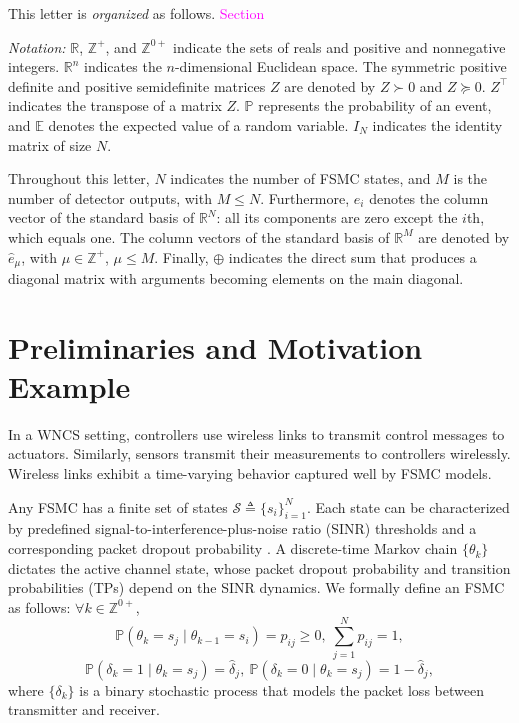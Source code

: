 \documentclass[journal,twoside,web]{ieeecolor}
\begin{document}
This letter is \emph{organized} as follows. 
\textcolor{magenta}{Section}

\textit{Notation:} $\mathbb{R}$, $\mathbb{Z}^{+}$, and $\mathbb{Z}^{0+}$ indicate the sets of reals and positive and nonnegative integers. $\mathbb{R}^{n}$ indicates the $n$-dimensional Euclidean space. The symmetric positive definite and positive semidefinite matrices $Z$ are denoted by $Z\succ 0$ and $Z\succeq 0$. $Z^{\top}$ indicates the transpose of a matrix $Z$. $\mathbb{P}$ represents the probability of an event, and $\mathbb{E}$ denotes the expected value of a random variable. $I_N$ indicates the identity matrix of size $N$. 

Throughout this letter, $N$ indicates the number of FSMC states, and $M$ is the number of detector outputs, with $M\leq N$.
Furthermore, $e_i$ denotes the column vector of the standard basis of $\mathbb{R}^{N}$: all its components are zero except the $i$th, which equals one. The column vectors of the standard basis of $\mathbb{R}^{M}$ are denoted by $\hat{e}_{\mu}$, with $\mu\in\mathbb{Z}^{+}$, $\mu\leq M$. 
Finally, $\oplus$ indicates the direct sum that produces a diagonal matrix with arguments becoming elements on the main diagonal.

\section{Preliminaries and Motivation Example}\label{sec:model}
In a WNCS setting, controllers use wireless links to transmit control messages to actuators. 
Similarly, sensors transmit their measurements to controllers wirelessly. Wireless links exhibit a time-varying behavior captured well by FSMC models. 

Any FSMC has a finite set of states $\mathcal{S}\triangleq\{s_i\}_{i=1}^{N}$. Each state can be characterized by predefined signal-to-interference-plus-noise ratio (SINR) thresholds and a corresponding packet dropout probability \cite{zacchialun2024access}. A discrete-time Markov chain $\{\theta_k\}$ dictates the active channel state, whose packet dropout probability and transition probabilities (TPs) depend on the SINR dynamics. We formally define an FSMC as follows: $\forall k\in \mathbb{Z}^{0+}$,
\begin{equation}\label{eq:p-ij}
    \mathbb{P}(\theta_{k} = s_j \mid \theta_{k-1} = s_i) = p_{ij} \geq 0,~ \sum_{j=1}^N p_{ij} = 1,
\end{equation}
\begin{equation}\label{eq:p-delta}
    \mathbb{P}(\delta_k = 1 \mid \theta_{k} = s_j) = \hat{\delta}_{j},~
    \mathbb{P}(\delta_k = 0 \mid \theta_{k} = s_j) = 1 - \hat{\delta}_{j},
\end{equation}
where $\{\delta_k\}$ is a binary stochastic process that models the packet loss between transmitter and receiver.
\end{document}
